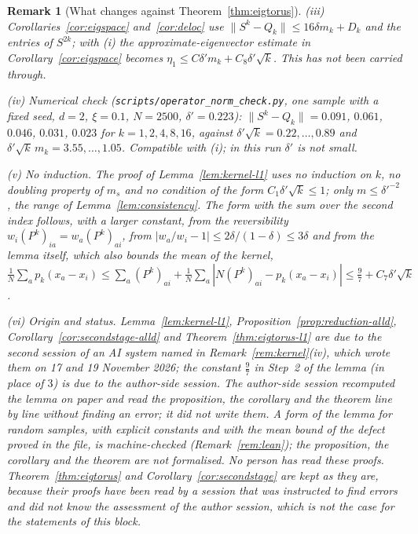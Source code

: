 \documentclass[11pt,a4paper]{article}
\theoremstyle{stmt}
\theoremstyle{defn}
\theoremstyle{rmk}
\newtheorem{remark}[theorem]{Remark}
\numberwithin{equation}{section}
\begin{document}
{\begin{remark}[What changes against Theorem~\ref{thm:eigtorus}]
(iii) Corollaries~\ref{cor:eigspace} and~\ref{cor:deloc} use $\|S^k-Q_k\|\le16\delta m_k+D_k$ and the
entries of $S^{2k}$; with (i) the approximate-eigenvector estimate in Corollary~\ref{cor:eigspace} becomes
$\eta_1\le C\delta'm_k+C_8\delta'\sqrt k$. This has not been carried through.

(iv) \emph{Numerical check} (\texttt{scripts/operator\_norm\_check.py}, one sample with a fixed seed, $d=2$, $\xi=0.1$,
$N=2500$, $\delta'=0.223$): $\|S^k-Q_k\|=0.091$, $0.061$, $0.046$, $0.031$, $0.023$ for $k=1,2,4,8,16$,
against $\delta'\sqrt k=0.22,\dots,0.89$ and $\delta'\sqrt k\,m_k=3.55,\dots,1.05$. Compatible with (i); in
this run $\delta'$ is not small.

(v) \emph{No induction.} The proof of Lemma~\ref{lem:kernel-l1} uses no induction on $k$, no doubling property of $m_s$ and no condition of the form $C_1\delta'\sqrt k\le1$; only $m\le\delta'^{-2}$, the range of Lemma~\ref{lem:consistency}. The form with the sum over the second index follows, with a larger constant, from the reversibility $w_i(P^k)_{ia}=w_a(P^k)_{ai}$, from $|w_a/w_i-1|\le2\delta/(1-\delta)\le3\delta$ and from the lemma itself, which also bounds the mean of the kernel, $\frac1N\sum_ap_k(x_a-x_i)\le\sum_a(P^k)_{ai}+\frac1N\sum_a|N(P^k)_{ai}-p_k(x_a-x_i)|\le\frac97+C_7\delta'\sqrt k$.

(vi) \emph{Origin and status.} Lemma~\ref{lem:kernel-l1}, Proposition~\ref{prop:reduction-alld}, Corollary~\ref{cor:secondstage-alld} and Theorem~\ref{thm:eigtorus-l1} are due to the second session of an AI system named in Remark~\ref{rem:kernel}(iv), which wrote them on 17 and 19 November 2026; the constant $\frac97$ in Step~2 of the lemma (in place of $3$) is due to the author-side session. The author-side session recomputed the lemma on paper and read the proposition, the corollary and the theorem line by line without finding an error; it did not write them. A form of the lemma for random samples, with explicit constants and with the mean bound of the defect proved in the file, is machine-checked (Remark~\ref{rem:lean}); the proposition, the corollary and the theorem are not formalised. No person has read these proofs. Theorem~\ref{thm:eigtorus} and Corollary~\ref{cor:secondstage} are kept as they are, because their proofs have been read by a session that was instructed to find errors and did not know the assessment of the author session, which is not the case for the statements of this block.
\end{remark}

}
\end{document}
